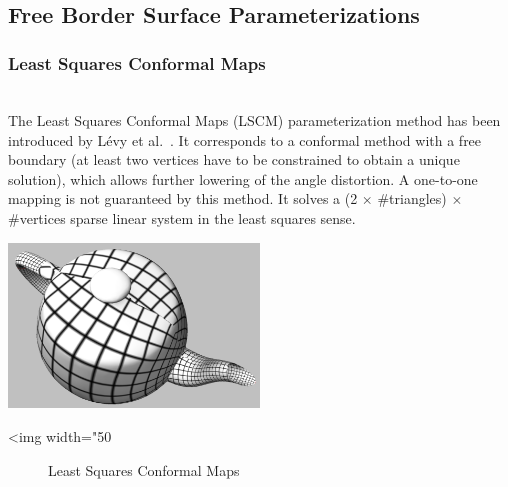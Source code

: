   \\
  \\
  \\
  \\


\subsection{Free Border Surface Parameterizations}

\subsubsection{Least Squares Conformal Maps}

  \\

The Least Squares Conformal Maps (LSCM) parameterization method has
been introduced by L\'evy et al.~\cite{cgal:lprm-lscm-02}. It
corresponds to a conformal method with a free boundary (at least two
vertices have to be constrained to obtain a unique solution), which
allows further lowering of the angle distortion. A one-to-one mapping
is not guaranteed by this method. It solves a (2 $\times$
\#triangles) $\times$ \#vertices sparse linear system in the least squares sense.

\begin{center}
    \label{parameterization-fig-LSCM}
    \begin{ccTexOnly}
        \includegraphics[width=0.5\textwidth]{Parameterization/LSCM} %
    \end{ccTexOnly}
    \begin{ccHtmlOnly}
        <img width="50%
    \end{ccHtmlOnly}
    \begin{figure}[h]
        \caption{Least Squares Conformal Maps}
    \end{figure}
\end{center}


